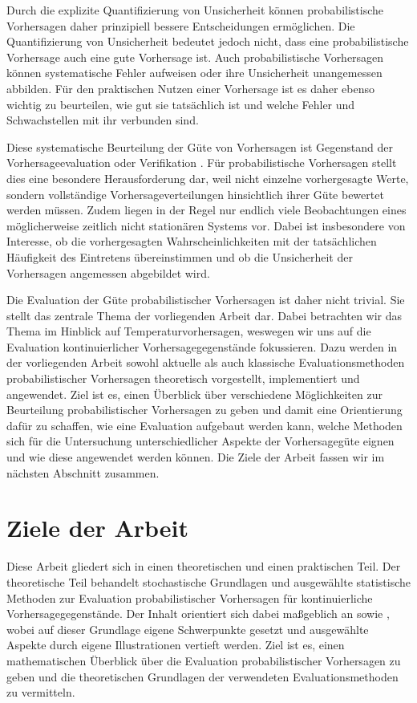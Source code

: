 Durch die explizite Quantifizierung von Unsicherheit können probabilistische Vorhersagen daher prinzipiell bessere Entscheidungen ermöglichen. Die Quantifizierung von Unsicherheit bedeutet jedoch nicht, dass eine probabilistische Vorhersage auch eine gute Vorhersage ist. Auch probabilistische Vorhersagen können systematische Fehler aufweisen oder ihre Unsicherheit unangemessen abbilden. Für den praktischen Nutzen einer Vorhersage ist es daher ebenso wichtig zu beurteilen, wie gut sie tatsächlich ist und welche Fehler und Schwachstellen mit ihr verbunden sind.

Diese systematische Beurteilung der Güte von Vorhersagen ist Gegenstand der Vorhersageevaluation oder Verifikation \parencite{wilks}. Für probabilistische Vorhersagen stellt dies eine besondere Herausforderung dar, weil nicht einzelne vorhergesagte Werte, sondern vollständige Vorhersageverteilungen hinsichtlich ihrer Güte bewertet werden müssen. Zudem liegen in der Regel nur endlich viele Beobachtungen eines möglicherweise zeitlich nicht stationären Systems vor. Dabei ist insbesondere von Interesse, ob die vorhergesagten Wahrscheinlichkeiten mit der tatsächlichen Häufigkeit des Eintretens übereinstimmen und ob die Unsicherheit der Vorhersagen angemessen abgebildet wird.

Die Evaluation der Güte probabilistischer Vorhersagen ist daher nicht trivial. Sie stellt das zentrale Thema der vorliegenden Arbeit dar. Dabei betrachten wir das Thema im Hinblick auf Temperaturvorhersagen, weswegen wir uns auf die Evaluation kontinuierlicher Vorhersagegegenstände fokussieren. Dazu werden in der vorliegenden Arbeit sowohl aktuelle als auch klassische Evaluationsmethoden probabilistischer Vorhersagen theoretisch vorgestellt, implementiert und angewendet. Ziel ist es, einen Überblick über verschiedene Möglichkeiten zur Beurteilung probabilistischer Vorhersagen zu geben und damit eine Orientierung dafür zu schaffen, wie eine Evaluation aufgebaut werden kann, welche Methoden sich für die Untersuchung unterschiedlicher Aspekte der Vorhersagegüte eignen und wie diese angewendet werden können. Die Ziele der Arbeit fassen wir im nächsten Abschnitt zusammen.

\section{Ziele der Arbeit}
Diese Arbeit gliedert sich in einen theoretischen und einen praktischen Teil. Der theoretische Teil behandelt stochastische Grundlagen und ausgewählte statistische Methoden zur Evaluation probabilistischer Vorhersagen für kontinuierliche Vorhersagegegenstände. Der Inhalt orientiert sich dabei maßgeblich an \textcite{gneiting2023regression} sowie \textcite{gneiting2014probabilistic}, wobei auf dieser Grundlage eigene Schwerpunkte gesetzt und ausgewählte Aspekte durch eigene Illustrationen vertieft werden. Ziel ist es, einen mathematischen Überblick über die Evaluation probabilistischer Vorhersagen zu geben und die theoretischen Grundlagen der verwendeten Evaluationsmethoden zu vermitteln.  

